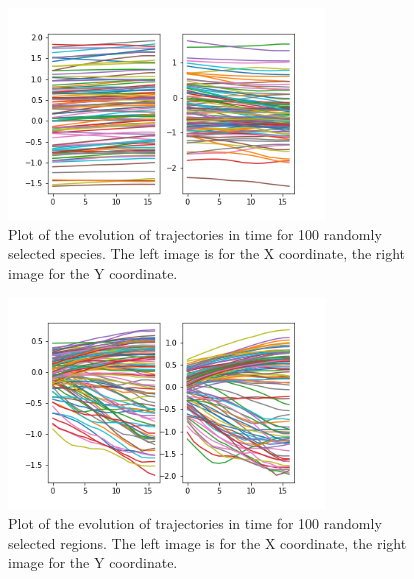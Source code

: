 \documentclass[mscthesis]{usiinfthesis}
\begin{document}

\begin{figure}[H]
    \centering
    \includegraphics[width=0.75\textwidth]{trajectories_species.png}
    \caption{Plot of the evolution of trajectories in time for 100 randomly selected species. The left image is for the X coordinate, the right image for the Y coordinate.}
    \label{fig:trajectories_species}
\end{figure}

\begin{figure}[H]
    \centering
    \includegraphics[width=0.75\textwidth]{trajectories_region.png}
    \caption{Plot of the evolution of trajectories in time for 100 randomly selected regions. The left image is for the X coordinate, the right image for the Y coordinate.}
    \label{fig:trajectories_region}
\end{figure}
\end{document}
